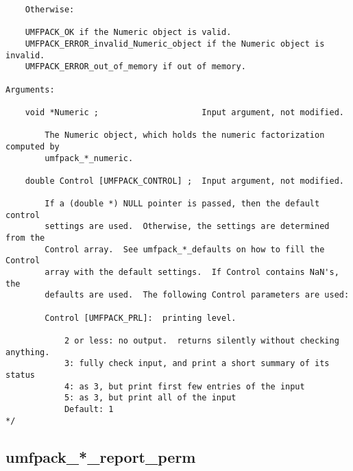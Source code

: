 \documentclass[11pt]{article}
\begin{document}
{\begin{verbatim}
    Otherwise:

    UMFPACK_OK if the Numeric object is valid.
    UMFPACK_ERROR_invalid_Numeric_object if the Numeric object is invalid.
    UMFPACK_ERROR_out_of_memory if out of memory.

Arguments:

    void *Numeric ;                     Input argument, not modified.

        The Numeric object, which holds the numeric factorization computed by
        umfpack_*_numeric.

    double Control [UMFPACK_CONTROL] ;  Input argument, not modified.

        If a (double *) NULL pointer is passed, then the default control
        settings are used.  Otherwise, the settings are determined from the
        Control array.  See umfpack_*_defaults on how to fill the Control
        array with the default settings.  If Control contains NaN's, the
        defaults are used.  The following Control parameters are used:

        Control [UMFPACK_PRL]:  printing level.

            2 or less: no output.  returns silently without checking anything.
            3: fully check input, and print a short summary of its status
            4: as 3, but print first few entries of the input
            5: as 3, but print all of the input
            Default: 1
*/
\end{verbatim}
}

\newpage
\subsection{umfpack\_*\_report\_perm}
\end{document}
